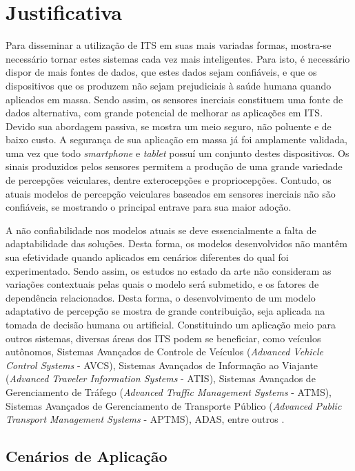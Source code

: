 \section{Justificativa}

Para disseminar a utilização de ITS em suas mais variadas formas, mostra-se necessário tornar estes sistemas cada vez mais inteligentes. Para isto, é necessário dispor de mais fontes de dados, que estes dados sejam confiáveis, e que os dispositivos que os produzem não sejam prejudiciais à saúde humana quando aplicados em massa. Sendo assim, os sensores inerciais constituem uma fonte de dados alternativa, com grande potencial de melhorar as aplicações em ITS. Devido sua abordagem passiva, se mostra um meio seguro, não poluente e de baixo custo. A segurança de sua aplicação em massa já foi amplamente validada, uma vez que todo \textit{smartphone} e \textit{tablet} possuí um conjunto destes dispositivos. Os sinais produzidos pelos sensores permitem a produção de uma grande variedade de percepções veiculares, dentre exterocepções e propriocepções. Contudo, os atuais modelos de percepção veiculares baseados em sensores inerciais não são confiáveis, se mostrando o principal entrave para sua maior adoção.

A não confiabilidade nos modelos atuais se deve essencialmente a falta de adaptabilidade das soluções. Desta forma, os modelos desenvolvidos não mantêm sua efetividade quando aplicados em cenários diferentes do qual foi experimentado. Sendo assim, os estudos no estado da arte não consideram as variações contextuais pelas quais o modelo será submetido, e os fatores de dependência relacionados. Desta forma, o desenvolvimento de um modelo adaptativo de percepção se mostra de grande contribuição, seja aplicada na tomada de decisão humana ou artificial. Constituindo um aplicação meio para outros sistemas, diversas áreas dos ITS podem se beneficiar, como veículos autônomos, Sistemas Avançados de Controle de Veículos (\textit{Advanced Vehicle Control Systems} - AVCS), Sistemas Avançados de Informação ao Viajante (\textit{Advanced Traveler Information Systems} - ATIS), Sistemas Avançados de Gerenciamento de Tráfego (\textit{Advanced Traffic Management Systems} - ATMS), Sistemas Avançados de Gerenciamento de Transporte Público (\textit{Advanced Public Transport Management Systems} - APTMS), ADAS, entre outros \cite{Zhang2011,Singh2015}.

\subsection{Cenários de Aplicação}

